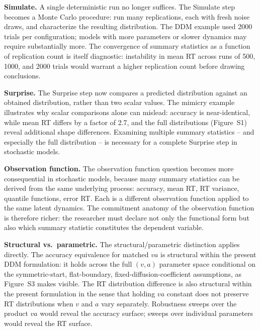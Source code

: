 \documentclass[11pt,a4paper]{article}
\begin{document}
\textbf{Simulate.} A single deterministic run no longer suffices. The Simulate step becomes a Monte Carlo procedure: run many replications, each with fresh noise draws, and characterize the resulting distribution. The DDM example used 2000 trials per configuration; models with more parameters or slower dynamics may require substantially more. The convergence of summary statistics as a function of replication count is itself diagnostic: instability in mean RT across runs of 500, 1000, and 2000 trials would warrant a higher replication count before drawing conclusions.

\textbf{Surprise.} The Surprise step now compares a predicted distribution against an obtained distribution, rather than two scalar values. The mimicry example illustrates why scalar comparisons alone can mislead: accuracy is near-identical, while mean RT differs by a factor of 2.7, and the full distributions (Figure~S1) reveal additional shape differences. Examining multiple summary statistics -- and especially the full distribution -- is necessary for a complete Surprise step in stochastic models.

\textbf{Observation function.} The observation function question becomes more consequential in stochastic models, because many summary statistics can be derived from the same underlying process: accuracy, mean RT, RT variance, quantile functions, error RT. Each is a different observation function applied to the same latent dynamics. The commitment anatomy of the observation function is therefore richer: the researcher must declare not only the functional form but also which summary statistic constitutes the dependent variable.

\textbf{Structural vs.\ parametric.} The structural/parametric distinction applies directly. The accuracy equivalence for matched $va$ is structural within the present DDM formulation: it holds across the full $(v,a)$ parameter space conditional on the symmetric-start, flat-boundary, fixed-diffusion-coefficient assumptions, as Figure~S3 makes visible. The RT distribution difference is also structural within the present formulation in the sense that holding $va$ constant does not preserve RT distributions when $v$ and $a$ vary separately. Robustness sweeps over the product $va$ would reveal the accuracy surface; sweeps over individual parameters would reveal the RT surface.
\end{document}
